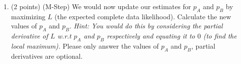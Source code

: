 \documentclass[11pt]{article}
\begin{document}
\begin{enumerate}[(1)]
\begin{enumerate}[(2.1)]
\textit{Hint: Recall $P(Z = 0) = P(Z = 1) = 0.5$. The complete data log-likelihood is defined as follows,
\[L = \sum_{i=1}^N\sum_{\alpha=0}^1\tau_{\alpha, x_i}\log p(X_i = x_i, Z = \alpha).\]
Here $X_i$ is the random variable indicating the outcome of the $i^{\textrm{th}}$ toss. For example $X_1 = x_1 = T$, $X_2 = x_2 = H$ and so on. }

\begin{answertext}{17cm}{}

\end{answertext}

\item (2 points) (M-Step) We would now update our estimates for $p_A$ and $p_B$ by maximizing $L$ (the expected complete data likelihood). Calculate the new values of $p_A$ and $p_B$. 
\textit{Hint: You would do this by considering the partial derivative of $L$ w.r.t $p_A$ and $p_B$ respectively and equating it to $0$ (to find the local maximum).} Please only answer the values of $p_A$ and $p_B$, partial derivatives are optional.


\begin{answertext}{10cm}{}

\end{answertext}


\end{enumerate}



\end{enumerate}
\end{document}

